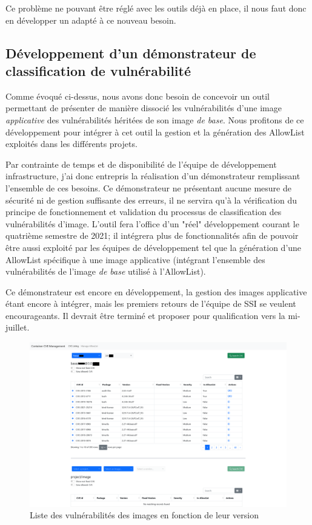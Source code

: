 Ce problème ne pouvant être réglé avec les outils déjà en place, il nous faut donc en développer un adapté à ce nouveau 
besoin.

\subsection{Développement d'un démonstrateur de classification de vulnérabilité}
Comme évoqué ci-dessus, nous avons donc besoin de concevoir un outil permettant de présenter de manière dissocié les
vulnérabilités d'une image \emph{applicative} des vulnérabilités héritées de son image \emph{de base}.
Nous profitons de ce développement pour intégrer à cet outil la gestion et la génération des AllowList exploités dans les
différents projets.

Par contrainte de temps et de disponibilité de l'équipe de développement infrastructure, j'ai donc entrepris la réalisation 
d'un démonstrateur remplissant l'ensemble de ces besoins. Ce démonstrateur ne présentant aucune mesure de sécurité ni de
gestion suffisante des erreurs, il ne servira qu'à la vérification du principe de fonctionnement et validation du 
processus de classification des vulnérabilités d'image.
\newline L'outil fera l'office d'un "réel" développement courant le quatrième semestre de 2021; il intégrera plus de 
fonctionnalités afin de pouvoir être aussi exploité par les équipes de développement tel que la génération d'une 
AllowList spécifique à une image applicative (intégrant l'ensemble des vulnérabilités de l'image \emph{de base} utilisé 
à l'AllowList). 

\newpage

Ce démonstrateur est encore en développement, la gestion des images applicative étant encore à intégrer, mais les 
premiers retours de l'équipe de \ac{SSI} se veulent encourageants.
\newline Il devrait être terminé et proposer pour qualification vers la mi-juillet.

\vspace{1cm}

\begin{figure}[h]
    \centering
    \includegraphics[width=0.9\linewidth]{resources/img/cont_mgnt_listing.png}
    \caption{Liste des vulnérabilités des images en fonction de leur version}
\end{figure}

